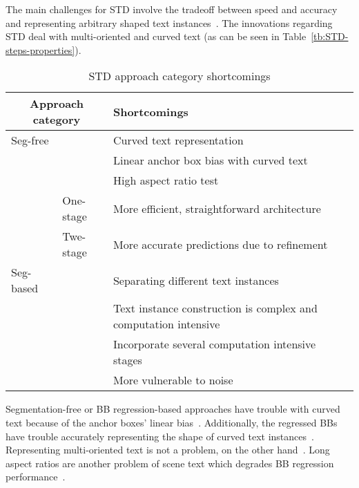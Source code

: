 The main challenges for \ac{STD} involve the tradeoff between speed and accuracy and
representing arbitrary shaped text instances~\citep{wang_efficient_2019}.
The innovations regarding \ac{STD} deal with multi-oriented and curved text (as can be seen in
Table~\ref{tb:STD-steps-properties}).
\begin{table}[h]
    \centering\scriptsize
    \begin{tabular}{p{}p{}p{}}
        \multicolumn{2}{c}{\textbf{Approach category}} & \textbf{Shortcomings} \\
        \toprule
        Seg-free & & Curved text representation~\citep{long_scene_2021,wang_shape_2019} \\
        & & Linear anchor box bias with curved text~\citep{wang_shape_2019,ferrari_textsnake_2018} \\
        & & High aspect ratio test~\citep{shi_detecting_2017,long_scene_2021} \\
        & One-stage & More efficient, straightforward architecture~\citep{lu_mimicdet_2020} \\
        & Twe-stage & More accurate predictions due to refinement~\citep{lu_mimicdet_2020} \\
        \midrule
        Seg-based & & Separating different text instances~\citep{wang_shape_2019} \\
        & & Text instance construction is complex and computation
            intensive~\citep{xie_aggregation_2019,liao_real-time_2019,qiao_text_2021} \\
        & & Incorporate several computation intensive stages~\citep{dai_fused_2018} \\
        & & More vulnerable to noise~\citep{long_scene_2021} \\
        \bottomrule
    \end{tabular}
    \caption{STD approach category shortcomings\label{tb:STD-shortcomings}}
\end{table}
Segmentation-free or \ac{BB} regression-based approaches have trouble with curved text because of
the anchor boxes' linear bias~\citep{wang_shape_2019,ferrari_textsnake_2018}.
Additionally, the regressed \acp{BB} have trouble accurately representing the shape of curved
text instances~\citep{long_scene_2021,wang_shape_2019}.
Representing multi-oriented text is not a problem, on the other
hand~\citep{liao_textboxes_2018,jiang_r2cnn_2017}.
Long aspect ratios are another problem of scene text which degrades \ac{BB} regression
performance~\citep{shi_detecting_2017,long_scene_2021}.


